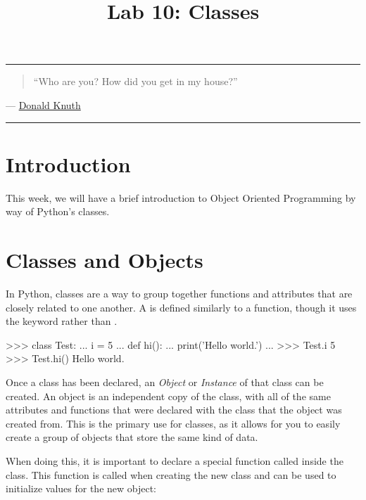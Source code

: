 \documentclass[11pt]{cselabheader}
\title{Lab 10: Classes}
\begin{document}
\maketitle

\hrule
\begin{quotation}
``Who are you? How did you get in my house?''
\end{quotation}
\begin{flushright}
  --- \href{https://xkcd.com/163/}{Donald Knuth}
\end{flushright}

\hrule

\section{Introduction}
This week, we will have a brief introduction to Object Oriented Programming by
way of Python's classes.

\pagebreak
\section{Classes and Objects}
\label{sec:classes}
In Python, classes are a way to group together functions and attributes
that are closely related to one another. A  is defined
similarly to a function, though it uses the  keyword rather
than .

\begin{pyconcode}
>>> class Test:
...     i = 5
...     def hi():
...         print('Hello world.')
...
>>> Test.i
5
>>> Test.hi()
Hello world.
\end{pyconcode}

Once a class has been declared, an \emph{Object} or
\emph{Instance} of that class can be created. An object is an independent
copy of the class, with all of the same attributes and functions that were
declared with the class that the object was created from. This is the
primary use for classes, as it allows for you to easily create a group of
objects that store the same kind of data.

When doing this, it is important to declare a special function called
 inside the class. This function is called when
creating the new class and can be used to initialize values for the
new object:

\end{document}
